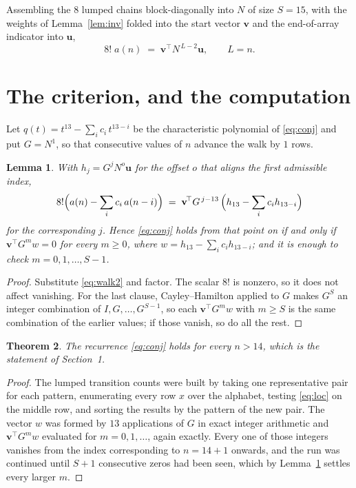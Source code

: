 \documentclass[11pt,a4paper]{article}
\theoremstyle{plain}
\newtheorem{theorem}{Theorem}
\newtheorem{lemma}[theorem]{Lemma}
\theoremstyle{definition}
\begin{document}
Assembling the $8$ lumped chains block-diagonally into $N$ of size $S=15$, with the
weights of Lemma~\ref{lem:inv} folded into the start vector $\mathbf{v}$ and the
end-of-array indicator into $\mathbf{u}$,
\begin{equation}\label{eq:walk2}
8!\;a(n)\;=\;\mathbf{v}^{\!\top}N^{\,L-2}\mathbf{u},\qquad L=n .
\end{equation}

\section{The criterion, and the computation}

Let $q(t)=t^{13}-\sum_i c_i\,t^{13-i}$ be the characteristic polynomial of
\eqref{eq:conj} and put $G=N^{1}$, so that consecutive values of $n$ advance the
walk by $1$ rows.

\begin{lemma}\label{lem:crit}
With $h_j=G^{j}N^{o}\mathbf{u}$ for the offset $o$ that aligns the first admissible
index,
\[
8!\Bigl(a(n)-\sum_i c_i\,a(n-i)\Bigr)\;=\;\mathbf{v}^{\!\top}G^{\,j-13}\,
\Bigl(h_{13}-\sum_i c_i h_{13-i}\Bigr)
\]
for the corresponding $j$. Hence \eqref{eq:conj} holds from that point on if and only if
$\mathbf{v}^{\!\top}G^{m}w=0$ for every $m\ge0$, where
$w=h_{13}-\sum_i c_ih_{13-i}$; and it is enough to check $m=0,1,\dots,S-1$.
\end{lemma}

\begin{proof}
Substitute \eqref{eq:walk2} and factor. The scalar $8!$ is nonzero, so it does not
affect vanishing. For the last clause, Cayley--Hamilton applied to $G$ makes $G^{S}$ an
integer combination of $I,G,\dots,G^{S-1}$, so each $\mathbf{v}^{\!\top}G^{m}w$ with
$m\ge S$ is the same combination of the earlier values; if those vanish, so do all the rest.
\end{proof}

\begin{theorem}
The recurrence \eqref{eq:conj} holds for every $n>14$, which is the statement of
Section~1.
\end{theorem}

\begin{proof}
The lumped transition counts were built by taking one representative pair for each pattern,
enumerating every row $x$ over the alphabet, testing \eqref{eq:loc} on the middle
row, and sorting the results by the pattern of the new pair. The vector $w$ was formed by
$13$ applications of $G$ in exact integer arithmetic and $\mathbf{v}^{\!\top}G^{m}w$
evaluated for $m=0,1,\dots$, again exactly. Every one of those integers vanishes from the
index corresponding to $n=14+1$ onwards, and the run was continued until $S+1$
consecutive zeros had been seen, which by Lemma~\ref{lem:crit} settles every larger $m$.
\end{proof}
\end{document}
